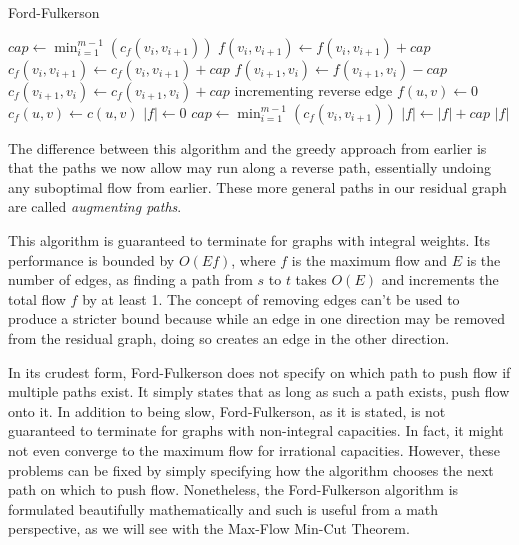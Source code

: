 \begin{algorithm}[H]
\caption{Ford-Fulkerson}
\begin{algorithmic}
\State $cap \gets \min_{i=1}^{m-1}(c_f(v_i,v_{i+1}))$
	\State $f(v_i,v_{i+1}) \gets f(v_i,v_{i+1}) + cap$
	\State $c_f(v_i,v_{i+1}) \gets c_f(v_i,v_{i+1}) + cap$
	\State $f(v_{i+1},v_i) \gets f(v_{i+1},v_i) - cap$
	\State $c_f(v_{i+1},v_i) \gets c_f(v_{i+1},v_i) + cap$
	\Comment incrementing reverse edge
\EndFor
\EndFunction
{}
		\State $f(u,v) \gets 0$
		\State $c_f(u,v) \gets c(u,v)$
	\EndFor
	\State $|f| \gets 0$
		\State $cap \gets \min_{i=1}^{m-1}(c_f(v_i,v_{i+1}))$
		\State $|f| \gets |f| + cap$
		\State {}
	\EndWhile
	\Return $|f|$
\EndFunction
\end{algorithmic}
\end{algorithm}

The difference between this algorithm and the greedy approach from earlier is that the paths we now allow may run along a reverse path, essentially undoing any suboptimal flow from earlier. These more general paths in our residual graph are called \textit{augmenting paths}.

This algorithm is guaranteed to terminate for graphs with integral weights. Its performance is bounded by $O(Ef)$, where $f$ is the maximum flow and $E$ is the number of edges, as finding a path from $s$ to $t$ takes $O(E)$ and increments the total flow $f$ by at least 1. The concept of removing edges can't be used to produce a stricter bound because while an edge in one direction may be removed from the residual graph, doing so creates an edge in the other direction.

In its crudest form, Ford-Fulkerson does not specify on which path to push flow if multiple paths exist. It simply states that as long as such a path exists, push flow onto it. In addition to being slow, Ford-Fulkerson, as it is stated, is not guaranteed to terminate for graphs with non-integral capacities. In fact, it might not even converge to the maximum flow for irrational capacities. However, these problems can be fixed by simply specifying how the algorithm chooses the next path on which to push flow. Nonetheless, the Ford-Fulkerson algorithm is formulated beautifully mathematically and such is useful from a math perspective, as we will see with the Max-Flow Min-Cut Theorem.

